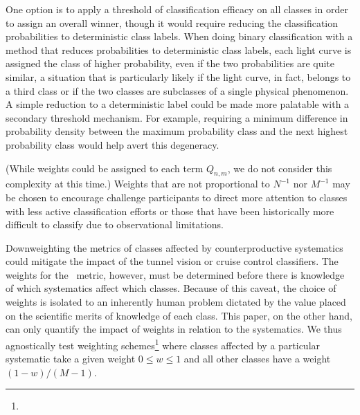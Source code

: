 One option is to apply a threshold of classification efficacy on all classes in order to assign an overall winner, though it would require reducing the classification probabilities to deterministic class labels.
When doing binary classification with a method that reduces probabilities to deterministic class labels, each light curve is assigned the class of higher probability, even if the two probabilities are quite similar, a situation that is particularly likely if the light curve, in fact, belongs to a third class or if the two classes are subclasses of a single physical phenomenon.
A simple reduction to a deterministic label could be made more palatable with a secondary threshold mechanism.
For example, requiring a minimum difference in probability density between the maximum probability class and the next highest probability class would help avert this degeneracy.

(While weights could be assigned to each term $Q_{n, m}$, we do not consider this complexity at this time.)
Weights that are not proportional to $N^{-1}$ nor $M^{-1}$ may be chosen to encourage challenge participants to direct more attention to classes with less active classification efforts or those that have been historically more difficult to classify due to observational limitations.

Downweighting the metrics of classes affected by counterproductive systematics could mitigate the impact of the tunnel vision or cruise control classifiers.
The weights for the \plasticc\ metric, however, must be determined before there is knowledge of which systematics affect which classes.
Because of this caveat, the choice of weights is isolated to an inherently human problem dictated by the value placed on the scientific merits of knowledge of each class.
This paper, on the other hand, can only quantify the impact of weights in relation to the systematics.
We thus agnostically test weighting schemes\footnote{}
where classes affected by a particular systematic take a given weight $0 \leq w \leq 1$ and all other classes have a weight $(1 - w) / (M - 1)$.
